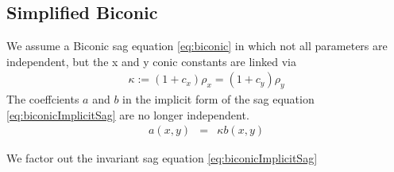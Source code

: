 \documentclass[12pt,a4paper,twoside,openright,BCOR10mm,headsepline,titlepage,abstracton,chapterprefix,final]{scrreprt}
\begin{document}
\subsection{Simplified Biconic}
We assume a Biconic sag equation \eqref{eq:biconic} in which not all parameters are independent, but the x and y conic constants are linked via
\begin{eqnarray}
 \kappa := (1 + c_x) \rho_x = (1 + c_y) \rho_y
\end{eqnarray}
The coeffcients $a$ and $b$ in the implicit form of the sag equation \ref{eq:biconicImplicitSag} are no longer independent.
\begin{eqnarray}
 a(x,y) &=& \kappa b(x,y) 
\end{eqnarray}

We factor out the invariant sag equation \ref{eq:biconicImplicitSag}
\end{document}
